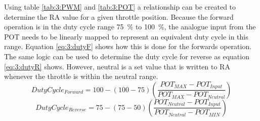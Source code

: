 		Using table \ref{tab:3:PWM} and \ref{tab:3:POT} a relationship can be created to determine the RA value for a given throttle position. Because the forward operation is in the duty cycle range \SI{75}{\percent} to \SI{100}{\percent}, the analogue input from the POT needs to be linearly mapped to represent an equivalent duty cycle in this range. Equation \ref{eq:3:dutyF} shows how this is done for the forwards operation. The same logic can be used to determine the duty cycle for reverse as equation \ref{eq:3:dutyR} shows. However, neutral is a set value that is written to RA whenever the throttle is within the neutral range.
		\begin{equation}
			Duty Cycle_{Forward} = 100 - (100-75)(\frac{POT_{MAX} - POT_{Input}}{POT_{MAX} - POT_{Neutral}})
			\label{eq:3:dutyF}
		\end{equation}
		\begin{equation}
			Duty Cycle_{Reverse} = 75 - (75-50)(\frac{POT_{Neutral} - POT_{Input}}{POT_{Neutral} - POT_{MIN}})
			\label{eq:3:dutyR}
		\end{equation}
